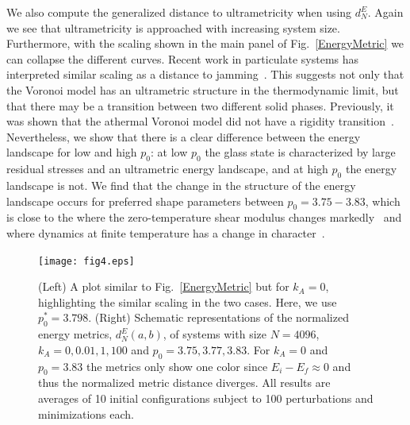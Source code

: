 \documentclass[reprint,amsmath,amssymb,aps]{revtex4-2}
\begin{document}
We also compute the generalized distance to ultrametricity when using $d_N^E$. Again we see that ultrametricity is approached with increasing system size. Furthermore, with the scaling shown in the main panel of  Fig.~\ref{EnergyMetric} we can collapse the different curves. Recent work in particulate systems has interpreted similar scaling as a distance to jamming~\cite{Dennis2020, Goodrich2012}. This suggests not only that the Voronoi model has an ultrametric structure in the thermodynamic limit, but that there may be a transition between two different solid phases. Previously, it was shown that the athermal Voronoi model did not have a rigidity transition~\cite{Sussman2018}. Nevertheless, we show that there is a clear difference between the energy landscape for low and high $p_0$: at low $p_0$ the glass state is characterized by large residual stresses and an ultrametric energy landscape, and at high $p_0$ the energy landscape is not. We find that the change in the structure of the energy landscape occurs for preferred shape parameters between $p_0=3.75-3.83$, which is close to the where the zero-temperature shear modulus changes markedly~\cite{Sussman2018} and where dynamics at finite temperature has a change in character~\cite{Bi2016, Sussman2018a,Li2021}.

\begin{figure}[t!]
	\texttt{[image: fig4.eps]}
	\caption{\label{EnergyKAMetric} (Left) A plot similar to Fig.~\ref{EnergyMetric} but for $k_A=0$, highlighting the similar scaling in the two cases. Here, we use $p_0^*=3.798$. (Right) Schematic representations of the normalized energy metrics, $d_N^E(a,b)$, of systems with size $N=4096$, $k_A={0,0.01,1,100}$ and $p_0={3.75, 3.77, 3.83}$. For $k_A=0$ and $p_0=3.83$ the metrics only show one color since $E_i-E_f\approx 0$ and thus the normalized metric distance diverges. All results are averages of 10 initial configurations subject to 100 perturbations and minimizations each.
	}
\end{figure}
\end{document}
